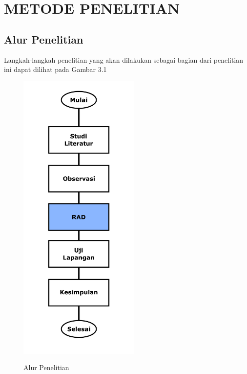 

\chapter{METODE PENELITIAN}

%
\vspace{4.5pt}

\begin{flushleft}
   \begin{justify}
      \section{Alur Penelitian}
      Langkah-langkah penelitian yang akan dilakukan sebagai bagian dari penelitian ini dapat dilihat pada Gambar 3.1
      \begin{figure}[ht]
         \centering
         \includegraphics[width=6cm]{images/alur_penelitian.png}\\
         \caption{Alur Penelitian}
     \end{figure}


\end{justify}
\end{flushleft}
